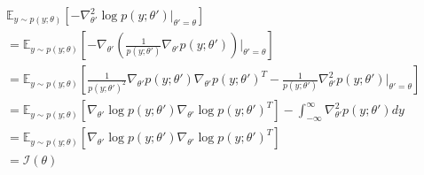 \begin{answer}
\begin{align*}
    &\mathbb{E}_{y\sim p(y;\theta)}[-\nabla^2_{\theta'} \log p(y;\theta')|_{\theta'=\theta}]\\
    &= \mathbb{E}_{y\sim p(y;\theta)}[-\nabla_{\theta'} (\frac{1}{p(y;\theta')}\nabla_{\theta'} p(y;\theta'))|_{\theta'=\theta}]\\
    &= \mathbb{E}_{y\sim p(y;\theta)}[\frac{1}{p(y;\theta')^2}\nabla_{\theta'} p(y;\theta') \nabla_{\theta'} p(y;\theta')^T - \frac{1}{p(y;\theta')}\nabla^2_{\theta'}p(y;\theta')|_{\theta'=\theta}]\\
    &= \mathbb{E}_{y\sim p(y;\theta)}[\nabla_{\theta'} \log p(y;\theta') \nabla_{\theta'} \log p(y;\theta')^T] - \int_{-\infty}^\infty \nabla^2_{\theta'}p(y;\theta')dy\\
    &= \mathbb{E}_{y\sim p(y;\theta)}[\nabla_{\theta'} \log p(y;\theta') \nabla_{\theta'} \log p(y;\theta')^T]\\
    &=\mathcal{I}(\theta)
\end{align*}
\end{answer}
